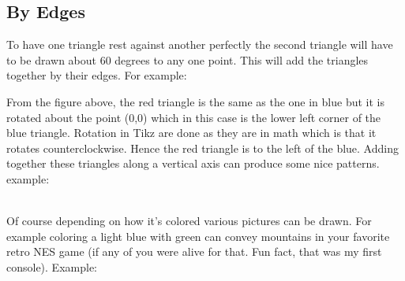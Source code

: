 \documentclass[11pt]{article}
\begin{document}
\subsection{By Edges}
To have one triangle rest against another perfectly the second triangle will have to be drawn about 60 degrees to any one point. This will add the triangles together by their edges.
For example:
\bigskip
\\
\bigskip
\newline
From the figure above, the red triangle is the same as the one in blue but it is rotated about the point (0,0)  which in this case is the lower left corner of the blue triangle. Rotation in Tikz are done as they are in math
which is that it rotates counterclockwise. Hence the red triangle is to the left of the blue. 
\bigskip
\newline
Adding together these triangles along a vertical axis can produce some nice patterns.
example:\\
\\
\bigskip
Of course depending on how it's colored various pictures can be drawn. For example coloring a 
light blue with green can convey mountains in your favorite retro NES game (if any of you were alive for that. Fun fact, that was my first console). Example:\\
\bigskip
{}
\end{document}
